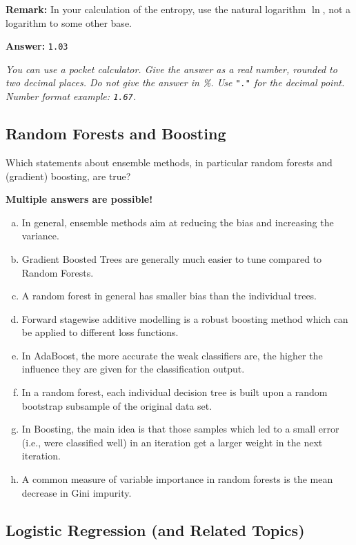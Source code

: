 \documentclass{article}
\begin{document}
\textbf{Remark:} In your calculation of the entropy, use the natural logarithm \(\ln\), not a logarithm to some other base.

\textbf{Answer:} \texttt{1.03}

\textit{You can use a pocket calculator. Give the answer as a real number, rounded to two decimal places. Do not give the answer in \%. Use \texttt{"."} for the decimal point. Number format example: \texttt{1.67}.}

\subsection*{Random Forests and Boosting}

Which statements about ensemble methods, in particular random forests and (gradient) boosting, are true?

\textbf{Multiple answers are possible!}

\begin{enumerate}[(a)]
    \item In general, ensemble methods aim at reducing the bias and increasing the variance.
    \item Gradient Boosted Trees are generally much easier to tune compared to Random Forests.
    \item A random forest in general has smaller bias than the individual trees.
    \item Forward stagewise additive modelling is a robust boosting method which can be applied to different loss functions.
    \item In AdaBoost, the more accurate the weak classifiers are, the higher the influence they are given for the classification output.
    \item In a random forest, each individual decision tree is built upon a random bootstrap subsample of the original data set.
    \item In Boosting, the main idea is that those samples which led to a small error (i.e., were classified well) in an iteration get a larger weight in the next iteration.
    \item A common measure of variable importance in random forests is the mean decrease in Gini impurity.
\end{enumerate}

\subsection*{Logistic Regression (and Related Topics)}
\end{document}
